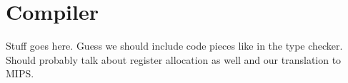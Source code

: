 \chapter{Compiler}
Stuff goes here. Guess we should include code pieces like in the
type checker. Should probably talk about register allocation as well and
our translation to MIPS.
